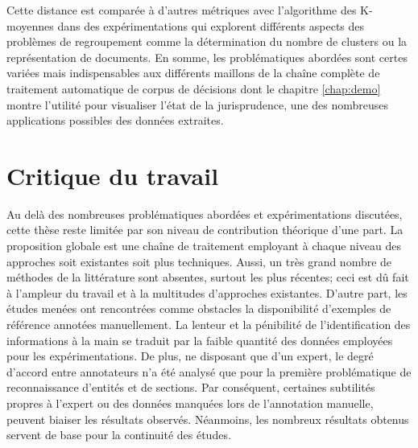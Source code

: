 Cette distance est comparée à d'autres métriques avec l'algorithme des K-moyennes dans des expérimentations qui explorent différents aspects des problèmes de regroupement comme la détermination du nombre de clusters ou la représentation de documents. En somme, les problématiques abordées sont certes variées mais indispensables aux différents maillons de la chaîne complète de traitement automatique de corpus de décisions dont le chapitre \ref{chap:demo} montre l'utilité pour visualiser l'état de la jurisprudence, une des nombreuses applications possibles des données extraites. 


\section{Critique du travail}
\label{sec:conclusion:critique}
Au delà des nombreuses problématiques abordées et expérimentations discutées, cette thèse reste limitée par son niveau de contribution théorique d'une part. La proposition globale est une chaîne de traitement employant à chaque niveau des approches soit existantes soit plus techniques. Aussi, un très grand nombre de méthodes de la littérature sont absentes, surtout les plus récentes; ceci est dû fait à l'ampleur du travail et à la multitudes d'approches existantes.  D'autre part, les études menées ont rencontrées comme obstacles la disponibilité d'exemples de référence annotées manuellement. La lenteur et la pénibilité de l'identification des informations à la main se traduit par la faible quantité des données employées pour les expérimentations. De plus, ne disposant que d'un expert, le degré d'accord entre annotateurs n'a été analysé que pour la première problématique de reconnaissance d'entités et de sections. Par conséquent, certaines subtilités propres à l'expert ou des données manquées lors de l'annotation manuelle, peuvent biaiser les résultats observés. Néanmoins, les nombreux résultats obtenus servent de base pour la continuité des études. 


